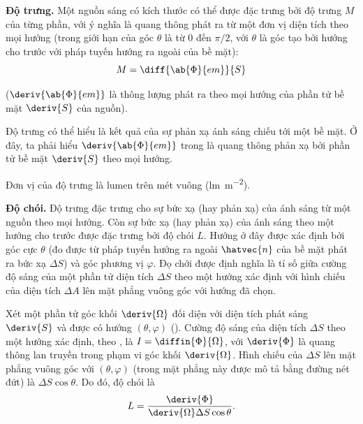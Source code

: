 \textbf{Độ trưng.}
Một nguồn sáng có kích thước có thể được đặc trưng bởi độ trưng $M$ của từng phần, với ý nghĩa là quang thông phát ra từ một đơn vị diện tích theo mọi hướng (trong giới hạn của góc $\theta$ là từ $0$ đến $\pi/2$, với $\theta$ là góc tạo bởi hướng cho trước với pháp tuyến hướng ra ngoài của bề mặt):
\begin{equation}\label{eq:16_47}
    M = \diff{\ab{\Phi}{em}}{S}
\end{equation}

\noindent
($\deriv{\ab{\Phi}{em}}$ là thông lượng phát ra theo mọi hướng của phần tử bề mặt $\deriv{S}$ của nguồn).

Độ trưng có thể hiểu là kết quả của sự phản xạ ánh sáng chiếu tới một bề mặt.
Ở đây, ta phải hiểu $\deriv{\ab{\Phi}{em}}$ trong  là quang thông phản xạ bởi phần tử bề mặt $\deriv{S}$ theo mọi hướng.

Đơn vị của độ trưng là lumen trên mét vuông (\si{\lumen\per\metre\squared}).

\textbf{Độ chói.}
Độ trưng đặc trưng cho sự bức xạ (hay phản xạ) của ánh sáng từ một nguồn theo mọi hướng.
Còn sự bức xạ (hay phản xạ) của ánh sáng theo một hướng cho trước được đặc trưng bởi độ chói $L$.
Hướng ở đây được xác định bởi góc cực $\theta$ (đo được từ pháp tuyến hướng ra ngoài $\hatvec{n}$ của bề mặt phát ra bức xạ $\Delta{S}$) và góc phương vị $\varphi$.
Đọ chới được định nghĩa là tỉ số giữa cường độ sáng của một phần tử diện tích $\Delta{S}$ theo một hướng xác định với hình chiếu của diện tích $\Delta{A}$ lên mặt phẳng vuông góc với hướng đã chọn.

Xét một phần tử góc khối $\deriv{\Omega}$ đối diện với diện tích phát sáng $\deriv{S}$ và được có hướng $(\theta, \varphi)$ ().
Cường độ sáng của diện tích $\Delta{S}$ theo một hướng xác định, theo , là $I = \diffin{\Phi}{\Omega}$, với $\deriv{\Phi}$ là quang thông lan truyền trong phạm vi góc khối $\deriv{\Omega}$.
Hình chiếu của $\Delta{S}$ lên mặt phẳng vuông góc với $(\theta, \varphi)$ (trong  mặt phẳng này được mô tả bằng đường nét đứt) là $\Delta{S}\cos\theta$.
Do đó, độ chói là
\begin{equation}\label{eq:16_48}
    L = \frac{\deriv{\Phi}}{\deriv{\Omega} \Delta{S} \cos\theta}.
\end{equation}

